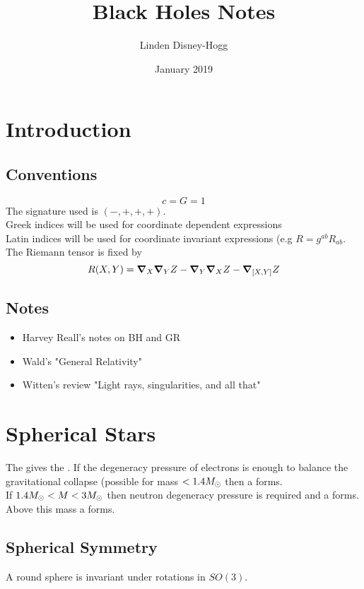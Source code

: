 \documentclass{article}
\title{Black Holes Notes}
\author{Linden Disney-Hogg}
\date{January 2019}
\begin{document}
\maketitle
\tableofcontents

\section{Introduction}
\subsection{Conventions}
\[
c = G = 1
\]
The signature used is $(-,+,+,+)$. \\
Greek indices will be used for coordinate dependent expressions \\
Latin indices will be used for coordinate invariant expressions (e.g $R=g^{ab}R_{ab}$.\\ 
The Riemann tensor is fixed by 
\[
R(X,Y) = \grad_X \grad_Y Z - \grad_Y \grad_X Z - \grad_{\comm[X]{Y}} Z
\]
\subsection{Notes}
\begin{itemize}
    \item Harvey Reall's notes on BH and GR 
    \item Wald's "General Relativity"
    \item Witten's review "Light rays, singularities, and all that"
\end{itemize}

\section{Spherical Stars}
The  gives the . If the degeneracy pressure of electrons is enough to balance the gravitational collapse (possible for mass  $<1.4 \msolar$ then a  forms.\\
If $1.4 \msolar < M < 3 \msolar$ then neutron degeneracy pressure is required and a  forms. Above this mass a  forms. 

\subsection{Spherical Symmetry}
A round sphere is invariant under rotations in $SO(3)$. 
\end{document}
